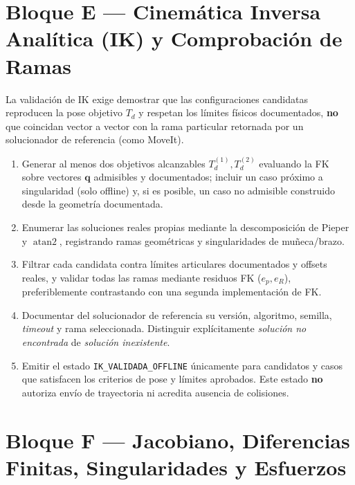 \documentclass[10pt, a4paper]{article}
\begin{document}
\section{Bloque E — Cinemática Inversa Analítica (IK) y Comprobación de Ramas}

La validación de IK exige demostrar que las configuraciones candidatas reproducen la pose objetivo $T_d$ y respetan los límites físicos documentados, \textbf{no} que coincidan vector a vector con la rama particular retornada por un solucionador de referencia (como MoveIt).

\begin{enumerate}[leftmargin=*, itemsep=2pt]
    \item Generar al menos dos objetivos alcanzables $T_d^{(1)}, T_d^{(2)}$ evaluando la FK sobre vectores $\mathbf{q}$ admisibles y documentados; incluir un caso próximo a singularidad (solo offline) y, si es posible, un caso no admisible construido desde la geometría documentada.
    \item Enumerar las soluciones reales propias mediante la descomposición de Pieper y $\operatorname{atan2}$, registrando ramas geométricas y singularidades de muñeca/brazo.
    \item Filtrar cada candidata contra límites articulares documentados y offsets reales, y validar todas las ramas mediante residuos FK ($e_p, e_R$), preferiblemente contrastando con una segunda implementación de FK.
    \item Documentar del solucionador de referencia su versión, algoritmo, semilla, \textit{timeout} y rama seleccionada. Distinguir explícitamente \textit{solución no encontrada} de \textit{solución inexistente}.
    \item Emitir el estado \texttt{IK\_VALIDADA\_OFFLINE} únicamente para candidatos y casos que satisfacen los criterios de pose y límites aprobados. Este estado \textbf{no} autoriza envío de trayectoria ni acredita ausencia de colisiones.
\end{enumerate}

\section{Bloque F — Jacobiano, Diferencias Finitas, Singularidades y Esfuerzos}
\end{document}

